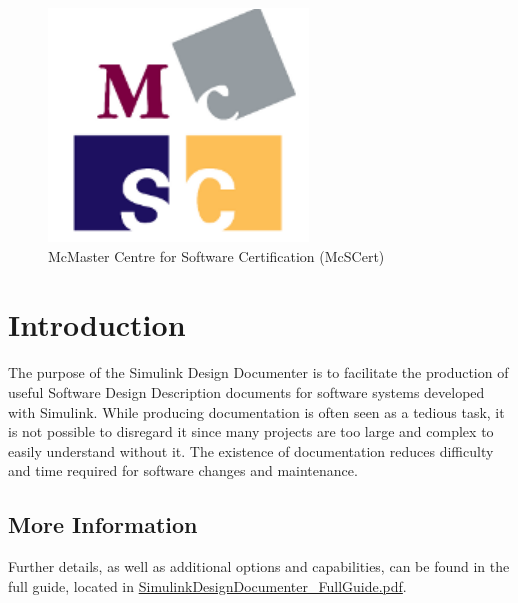 \documentclass{article}
\title{\ToolName}
\date{\monthyeardate\today}
\makeatletter
\newcommand{\ToolName}{Simulink Design Documenter\@\xspace}
\newcommand{\sdd}{Software Design Description\@\xspace}
\makeatother
\begin{document}
\maketitle
\vfill

\begin{figure}
	\centering
	\includegraphics[]{../../figs/McSCert_Logo.pdf} \\
	McMaster Centre for Software Certification (McSCert)
\end{figure}

\newpage

\tableofcontents
\newpage

\section{Introduction}


The purpose of the \ToolName is to facilitate the production of useful \sdd documents for software systems developed with Simulink. While producing documentation is often seen as a tedious task, it is not possible to disregard it since many projects are too large and complex to easily understand without it. The existence of documentation reduces difficulty and time required for software changes and maintenance.


\subsection{More Information}
Further details, as well as additional options and capabilities, can be found in the full guide, located in \href{run:SimulinkDesignDocumenter_FullGuide.pdf}{SimulinkDesignDocumenter\_FullGuide.pdf}.
\end{document}
